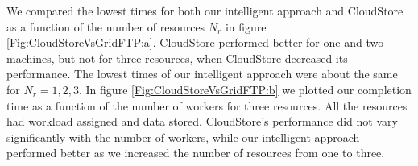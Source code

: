 \documentclass{rspublic}
\begin{document}
We compared the lowest times for both our intelligent approach and
CloudStore as a function of the number of resources $N_r$ in figure
\ref{Fig:CloudStoreVsGridFTP:a}. CloudStore performed better for one and
two machines, but not for three resources, when CloudStore decreased its
performance. The lowest times of our intelligent approach were about the
same for $N_r=1,2,3$. In figure \ref{Fig:CloudStoreVsGridFTP:b} we
plotted our completion time as a function of the number of workers for
three resources. All the resources had workload assigned and data
stored. CloudStore's performance did not vary significantly with the
number of workers, while our intelligent approach performed better as we
increased the number of resources from one to three.

\begin{figure}
\begin{center}
\end{center}
\end{figure}
\end{document}
